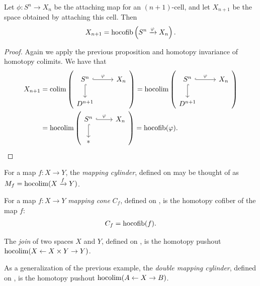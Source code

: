 \begin{example} Let $\phi: S^n \to X_n$ be the attaching map for an $(n+1)$-cell, and let $X_{n+1}$ be the space obtained by attaching this cell. Then
\begin{align*}
    X_{n+1} = \text{hocofib}\left(S^n \xrightarrow{\varphi} X_n\right).
\end{align*}
\end{example}
\begin{proof} Again we apply the previous proposition and homotopy invariance of homotopy colimits. We have that
\begin{align*}
    X_{n+1} &= \colim \left( \begin{tikzcd}[ampersand replacement=\&] S^n\rar[hook,"\phi" above]\dar[hook] \& X_n \\ D^{n+1} \& \end{tikzcd} \right) = \hocolim \left( \begin{tikzcd}[ampersand replacement=\&] S^n\rar[hook,"\phi" above]\dar[hook] \& X_n \\ D^{n+1} \& \end{tikzcd} \right) \\
    &=\hocolim \left( \begin{tikzcd}[ampersand replacement=\&] S^n\rar[hook,"\phi" above]\dar[hook] \& X_n \\ \ast \& \end{tikzcd} \right) = \hocofib(\phi).
\end{align*}
\end{proof}

\begin{example} For a map $f: X\to Y$, the \textit{mapping cylinder}, defined on \cite[p.2]{Hatcher} may be thought of as $M_f = \mathop{\operatorname*{hocolim}}(X \xrightarrow{f} Y)$.
\end{example}


\begin{example} For a map $f: X\to Y$ \textit{mapping cone} $C_f$, defined on \cite[p.13]{Hatcher}, is the homotopy cofiber of the map $f$:
\begin{align*}
    C_f = \text{hocofib}(f).
\end{align*}
\end{example}

\begin{example} The \textit{join} of two spaces $X$ and $Y$, defined on \cite[p.9]{Hatcher}, is the homotopy pushout $\mathop{\operatorname*{hocolim}}(X \leftarrow X\times Y \to Y)$.
\end{example}

\begin{example} As a generalization of the previous example, the \textit{double mapping cylinder}, defined on \cite[p.80]{May}, is the homotopy pushout $\mathop{\operatorname*{hocolim}}( A \leftarrow X \to B)$.
\end{example}

